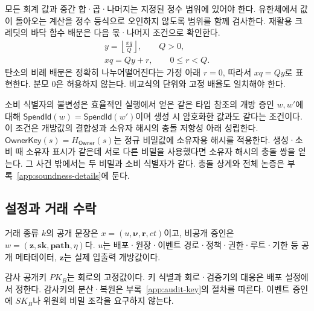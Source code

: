 모든 회계 값과 중간 합·곱·나머지는 지정된 정수 범위에 있어야 한다.
유한체에서 값이 돌아오는 계산을 정수 등식으로 오인하지 않도록
범위를 함께 검사한다. 재활용 크레딧의 바닥 함수 배분은
다음 몫·나머지 조건으로 확인한다.
\begin{equation}
 \begin{gathered}
 y=\left\lfloor\frac{xq}{Q}\right\rfloor,\qquad Q>0,\\
 xq=Qy+r,\qquad 0\leq r<Q.
 \end{gathered}
 \label{eq:floor}
\end{equation}
탄소의 비례 배분은 정확히 나누어떨어진다는 가정 아래
$r=0$, 따라서 $xq=Qy$로 표현한다.
분모 0은 허용하지 않는다. 비교식의 단위와 고정 배율도 일치해야 한다.

소비 식별자의 불변성은 효율적인 실행에서 얻은 같은 타입 참조의
개방 증인 $w,w'$에 대해
$\mathsf{SpendId}(w)=\mathsf{SpendId}(w')$이며
생성 시 암호화한 값과도 같다는 조건이다.
이 조건은 개방값의 결합성과 소유자 해시의 충돌 저항성 아래 성립한다.
$\mathsf{OwnerKey}(s)=H_{\mathsf{Owner}}(s)$는 정규 비밀값에
소유자용 해시를 적용한다. 생성·소비 때 소유자 표시가 같은데
서로 다른 비밀을 사용했다면 소유자 해시의 충돌 쌍을 얻는다.
그 사건 밖에서는 두 비밀과 소비 식별자가 같다.
충돌 상계와 전체 논증은 부록~\ref{app:soundness-details}에 둔다.

\subsection{설정과 거래 수락}
\label{app:acceptance}

거래 종류 $k$의 공개 문장은
$x=(u,\boldsymbol\nu,\boldsymbol r,ct)$이고,
비공개 증인은
$w=(\boldsymbol z,\boldsymbol{sk},\boldsymbol{path},\eta)$다.
$u$는 배포·원장·이벤트 경로·정책·권한·루트·기한 등 공개 메타데이터,
$\boldsymbol z$는 실제 입출력 개방값이다.

감사 공개키 $PK_B$는 회로의 고정값이다.
키 식별과 회로·검증기의 대응은 배포 설정에서 정한다.
감사키의 분산·복원은 부록~\ref{app:audit-key}의 절차를 따른다.
이벤트 증인에 $SK_B$나 위원회 비밀 조각을 요구하지 않는다.

